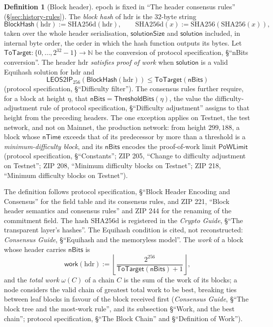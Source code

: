 \documentclass[11pt,a4paper]{article}
\theoremstyle{definition}
\newtheorem{definition}[theorem]{Definition}
\newcommand{\N}{\mathbb{N}}
\begin{document}
\begin{definition}[Block header]
epoch is fixed in ``The header consensus rules''
(\S\ref{sec:history-rules}). The \emph{block hash} of $\mathrm{hdr}$ is the
$32$-byte string
\[
  \mathsf{BlockHash}(\mathrm{hdr}) := \mathrm{SHA256d}(\mathrm{hdr}),
  \qquad
  \mathrm{SHA256d}(x) := \mathrm{SHA256}(\mathrm{SHA256}(x)),
\]
taken over the whole header serialisation, $\mathsf{solutionSize}$ and
$\mathsf{solution}$ included, in internal byte order, the order in which the
hash function outputs its bytes. Let
$\mathsf{ToTarget} \colon \{0, \dots, 2^{32} - 1\} \to \N$ be the conversion
of protocol specification, \S``nBits conversion''. The header $\mathrm{hdr}$
\emph{satisfies proof of work} when $\mathsf{solution}$ is a valid Equihash
solution for $\mathrm{hdr}$ and
\[
  \mathsf{LEOS2IP}_{256}(\mathsf{BlockHash}(\mathrm{hdr})) \le
  \mathsf{ToTarget}(\mathsf{nBits})
\]
(protocol specification, \S``Difficulty filter''). The consensus rules
further require, for a block at height $\eta$, that
$\mathsf{nBits} = \mathsf{ThresholdBits}(\eta)$, the value the
difficulty-adjustment rule of protocol specification, \S``Difficulty
adjustment'' assigns to that height from the preceding headers. The one
exception applies on Testnet, the test network, and not on Mainnet, the
production network: from height $299{,}188$, a block whose $\mathsf{nTime}$
exceeds that of its predecessor by more than a threshold is a
\emph{minimum-difficulty block}, and its $\mathsf{nBits}$ encodes the
proof-of-work limit $\mathsf{PoWLimit}$ (protocol specification,
\S``Constants''; ZIP 205, ``Change to difficulty adjustment on Testnet'';
ZIP 208, ``Minimum difficulty blocks on Testnet''; ZIP 218, ``Minimum
difficulty blocks on Testnet'').
\end{definition}

The definition follows protocol specification, \S``Block Header Encoding and
Consensus'' for the field table and its consensus rules, and ZIP 221, ``Block
header semantics and consensus rules'' and ZIP 244 for the renaming of the
commitment field. The hash $\mathrm{SHA256d}$ is registered in the
\emph{Crypto Guide}, \S``The transparent layer's hashes''. The Equihash
condition is cited, not reconstructed: \emph{Consensus Guide},
\S``Equihash and the memoryless model''. The \emph{work} of a block whose
header carries $\mathsf{nBits}$ is
\[
  \mathsf{work}(\mathrm{hdr}) :=
  \left\lfloor \frac{2^{256}}{\mathsf{ToTarget}(\mathsf{nBits}) + 1}
  \right\rfloor,
\]
and the \emph{total work} $\omega(C)$ of a chain $C$ is the sum of the work
of its blocks; a node considers the valid chain of greatest total work to
be best, breaking ties between leaf blocks in favour of the block received
first (\emph{Consensus Guide}, \S``The block tree and the most-work rule'',
and its subsection \S``Work, and the best chain''; protocol specification,
\S``The Block Chain'' and \S``Definition of Work'').
\end{document}

